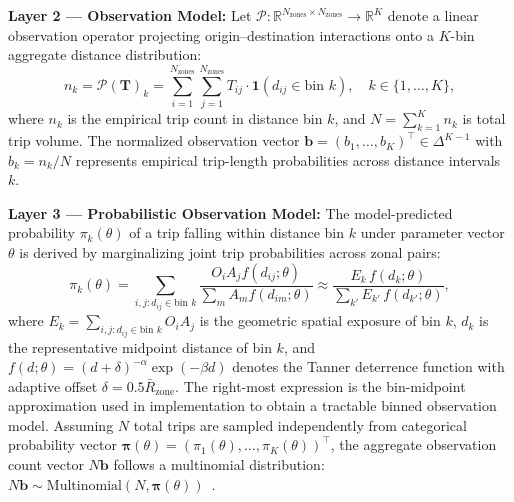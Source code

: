 \documentclass[pdflatex,sn-basic,iicol]{sn-jnl}
\begin{document}
\textbf{Layer 2 — Observation Model:} Let $\mathcal{P}: \mathbb{R}^{N_{\text{zones}} \times N_{\text{zones}}} \to \mathbb{R}^K$ denote a linear observation operator projecting origin--destination interactions onto a $K$-bin aggregate distance distribution:
\begin{equation}\label{eq:obs_operator}
n_k = \mathcal{P}(\mathbf{T})_k = \sum_{i=1}^{N_{\text{zones}}} \sum_{j=1}^{N_{\text{zones}}} T_{ij} \cdot \mathbf{1}(d_{ij} \in \text{bin } k), \quad k \in \{1, \dots, K\},
\end{equation}
where $n_k$ is the empirical trip count in distance bin $k$, and $N = \sum_{k=1}^K n_k$ is total trip volume. The normalized observation vector $\mathbf{b} = (b_1, \dots, b_K)^\top \in \Delta^{K-1}$ with $b_k = n_k / N$ represents empirical trip-length probabilities across distance intervals $k$.

\textbf{Layer 3 — Probabilistic Observation Model:} The model-predicted probability $\pi_k(\theta)$ of a trip falling within distance bin $k$ under parameter vector $\theta$ is derived by marginalizing joint trip probabilities across zonal pairs:
\begin{equation}\label{eq:predicted_prob_mle}
\pi_k(\theta) = \sum_{i,j: d_{ij} \in \text{bin } k} \frac{O_i A_j f(d_{ij}; \theta)}{\sum_m A_m f(d_{im}; \theta)} \approx \frac{E_k \, f(d_k; \theta)}{\sum_{k'} E_{k'} \, f(d_{k'}; \theta)},
\end{equation}
where $E_k = \sum_{i,j: d_{ij} \in \text{bin } k} O_i A_j$ is the geometric spatial exposure of bin $k$, $d_k$ is the representative midpoint distance of bin $k$, and $f(d; \theta) = (d + \delta)^{-\alpha} \exp(-\beta d)$ denotes the Tanner deterrence function with adaptive offset $\delta = 0.5 \bar{R}_{\mathrm{zone}}$. The right-most expression is the bin-midpoint approximation used in implementation to obtain a tractable binned observation model. Assuming $N$ total trips are sampled independently from categorical probability vector $\boldsymbol{\pi}(\theta) = (\pi_1(\theta), \dots, \pi_K(\theta))^\top$, the aggregate observation count vector $N \mathbf{b}$ follows a multinomial distribution: $N \mathbf{b} \sim \mathrm{Multinomial}(N, \boldsymbol{\pi}(\theta))$~\citep{casella2002statistical,murphy2012machine}.
\end{document}
